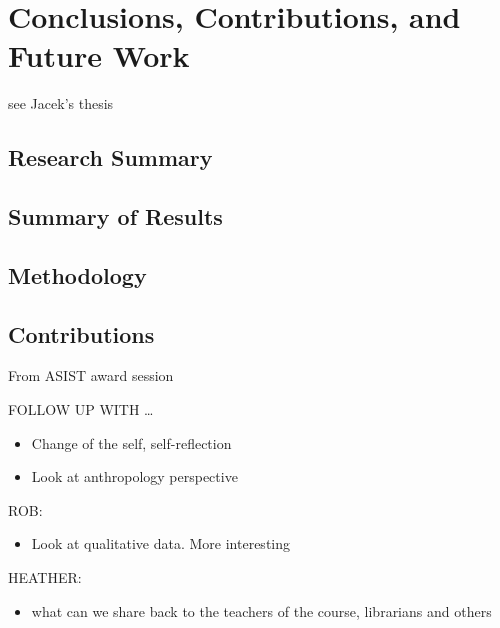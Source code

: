 \documentclass[letterpaper, nobind]{templates/ociamthesis}
\providecommand{\tightlist}{%
  \setlength{\itemsep}{0pt}\setlength{\parskip}{0pt}}
\begin{document}
\hypertarget{conclusions-contributions-and-future-work}{%
\chapter{Conclusions, Contributions, and Future Work}\label{conclusions-contributions-and-future-work}}

see Jacek's thesis

\hypertarget{research-summary}{%
\section{Research Summary}\label{research-summary}}

\hypertarget{summary-of-results}{%
\section{Summary of Results}\label{summary-of-results}}

\hypertarget{methodology}{%
\section{Methodology}\label{methodology}}

\hypertarget{contributions}{%
\section{Contributions}\label{contributions}}

From ASIST award session

FOLLOW UP WITH \ldots{}

\begin{itemize}
\tightlist
\item
  Change of the self, self-reflection
\item
  Look at anthropology perspective
\end{itemize}

ROB:

\begin{itemize}
\tightlist
\item
  Look at qualitative data. More interesting
\end{itemize}

HEATHER:

\begin{itemize}
\tightlist
\item
  what can we share back to the teachers of the course, librarians and others
\end{itemize}
\end{document}
